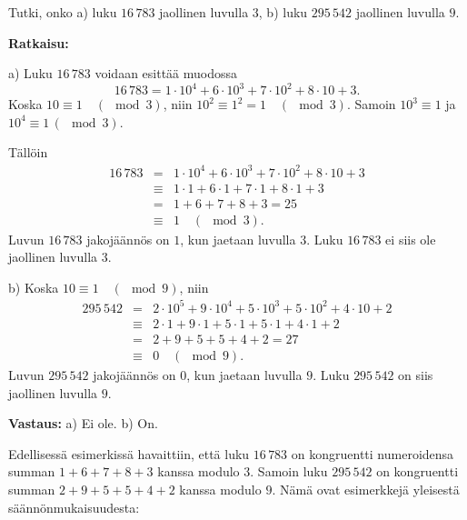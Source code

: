 \begin{esimerkki}
Tutki, onko a) luku $16\, 783$ jaollinen luvulla $3$, b) luku $295\, 542$ jaollinen luvulla $9$.

{\bf Ratkaisu:}

a)
Luku $16\, 783$ voidaan esittää muodossa
\[
16\, 783 = 1 \cdot 10^4 + 6 \cdot 10^3 + 7 \cdot 10^2 + 8 \cdot 10 + 3.
\]
Koska $10 \equiv 1 \quad(\mod 3)$, niin %
$10^2 \equiv 1^2 = 1 \quad (\mod 3)$. Samoin $10^3 \equiv 1$ ja $10^4 \equiv 1 \,(\mod 3)$.

Tällöin %
\begin{eqnarray*}
16\, 783 &=& 1 \cdot 10^4 + 6 \cdot 10^3 + 7 \cdot 10^2 + 8 \cdot 10 + 3\\
&\equiv& 1\cdot 1 + 6\cdot 1 + 7\cdot 1 + 8\cdot 1 + 3%
\\
&=& 1 + 6 + 7 + 8 + 3 = 25 \\
&\equiv& 1 \quad(\mod 3).
\end{eqnarray*}
Luvun $16\, 783$ jakojäännös on $1$, kun jaetaan luvulla $3$. Luku $16\, 783$ ei siis ole jaollinen luvulla $3$.

b) 
Koska $10 \equiv 1 \quad(\mod 9)$, niin 
\begin{eqnarray*}
295\, 542 &=& 2 \cdot 10^5 + 9 \cdot 10^4 + 5 \cdot 10^3 + 5 \cdot 10^2 + 4 \cdot 10 + 2\\
&\equiv& 2\cdot 1 + 9\cdot 1 + 5\cdot 1 + 5\cdot 1 + 4\cdot 1 + 2%
\\
&=& 2 + 9 + 5 + 5 + 4 + 2 = 27 \\
&\equiv& 0 \quad(\mod 9).
\end{eqnarray*}
Luvun $295\, 542$ jakojäännös on $0$, kun jaetaan luvulla $9$. Luku $295\, 542$ on siis jaollinen luvulla $9$.

{\bf Vastaus:} a) Ei ole. b) On.
\end{esimerkki}

Edellisessä esimerkissä havaittiin, että luku $16\, 783$ on kongruentti numeroidensa
summan $1 + 6 + 7 + 8 + 3$ kanssa modulo $3$. Samoin luku $295\, 542$  on kongruentti
summan $2 + 9 + 5 + 5+4+2$ kanssa modulo $9$. Nämä ovat esimerkkejä yleisestä
säännönmukaisuudesta:



